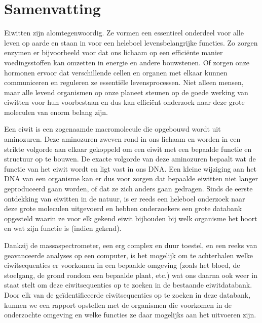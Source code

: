 \chapter*{Samenvatting}

Eiwitten zijn alomtegenwoordig.
Ze vormen een essentieel onderdeel voor alle leven op aarde en staan in voor een heleboel levensbelangrijke functies.
Zo zorgen enzymen er bijvoorbeeld voor dat ons lichaam op een efficiënte manier voedingsstoffen kan omzetten in energie en andere bouwstenen.
Of zorgen onze hormonen ervoor dat verschillende cellen en organen met elkaar kunnen communiceren en reguleren ze essentiële levensprocessen.
Niet alleen mensen, maar alle levend organismen op onze planeet steunen op de goede werking van eiwitten voor hun voorbestaan en dus kan efficiënt onderzoek naar deze grote moleculen van enorm belang zijn.

Een eiwit is een zogenaamde macromolecule die opgebouwd wordt uit aminozuren.
Deze aminozuren zweven rond in ons lichaam en worden in een strikte volgorde aan elkaar gekoppeld om een eiwit met een bepaalde functie en structuur op te bouwen.
De exacte volgorde van deze aminozuren bepaalt wat de functie van het eiwit wordt en ligt vast in ons DNA.
Een kleine wijziging aan het DNA van een organisme kan er dus voor zorgen dat bepaalde eiwitten niet langer geproduceerd gaan worden, of dat ze zich anders gaan gedragen.
Sinds de eerste ontdekking van eiwitten in de natuur, is er reeds een heleboel onderzoek naar deze grote moleculen uitgevoerd en hebben onderzoekers een grote databank opgesteld waarin ze voor elk gekend eiwit bijhouden bij welk organisme het hoort en wat zijn functie is (indien gekend).

Dankzij de massaspectrometer, een erg complex en duur toestel, en een reeks van geavanceerde analyses op een computer, is het mogelijk om te achterhalen welke eiwitsequenties er voorkomen in een bepaalde omgeving (zoals het bloed, de stoelgang, de grond rondom een bepaalde plant, etc.) wat ons daarna ook weer in staat stelt om deze eiwitsequenties op te zoeken in de bestaande eiwitdatabank.
Door elk van de geïdentificeerde eiwitsequenties op te zoeken in deze databank, kunnen we een rapport opstellen met de organismen die voorkomen in de onderzochte omgeving en welke functies ze daar mogelijks aan het uitvoeren zijn.

